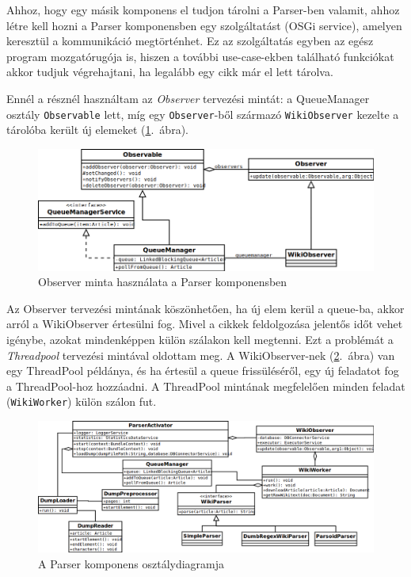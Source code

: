 Ahhoz, hogy egy másik komponens el tudjon tárolni a Parser-ben valamit, ahhoz létre kell hozni a Parser komponensben egy szolgáltatást (OSGi service), amelyen keresztül a kommunikáció megtörténhet. Ez az szolgáltatás egyben az egész program mozgatórugója is, hiszen a további use-case-ekben található funkciókat akkor tudjuk végrehajtani, ha legalább egy cikk már el lett tárolva.

Ennél a résznél használtam az \textit{Observer} tervezési mintát: a QueueManager osztály \texttt{Observable} lett, míg egy \texttt{Observer}-ből származó \texttt{WikiObserver} kezelte a tárolóba került új elemeket (\ref{fig:class_parser}.~ábra).

\begin{figure}[htp]
\centering
\includegraphics[scale=0.5]{img/class_parser}
\caption{Observer minta használata a Parser komponensben}
\label{fig:class_parser}
\end{figure}

Az Observer tervezési mintának köszönhetően, ha új elem kerül a queue-ba, akkor arról a WikiObserver értesülni fog. Mivel a cikkek feldolgozása jelentős időt vehet igénybe, azokat mindenképpen külön szálakon kell megtenni. Ezt a problémát a \textit{Threadpool} tervezési mintával oldottam meg. A WikiObserver-nek (\ref{fig:class_parser2}.~ábra) van egy ThreadPool példánya, és ha értesül a queue frissüléséről, egy új feladatot fog a ThreadPool-hoz hozzáadni. A ThreadPool mintának megfelelően minden feladat (\texttt{WikiWorker}) külön szálon fut. 

\begin{figure}[htp]
\centering
\includegraphics[scale=0.4]{img/class_parser2}
\caption{A Parser komponens osztálydiagramja}
\label{fig:class_parser2}
\end{figure}

